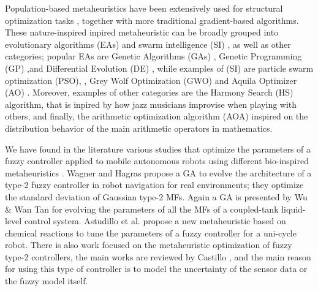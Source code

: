 \documentclass[symmetry,article,submit,moreauthors,pdftex]{Definitions/mdpi}
\begin{document}
Population-based metaheuristics have been extensively used for structural
optimization tasks \cite{perez2007particle,durgun2012structural,yildiz2012new,geem2005harmony}, 
together with more traditional gradient-based algorithms. These nature-inspired inpired 
metaheuristic can be broadly grouped into evolutionary
algorithms (EAs) \cite{back1996evolutionary} and swarm intelligence (SI)
\cite{kennedy2006swarm}, as well as other categories; popular EAs are Genetic
Algorithms (GAs) \cite{holland1992adaptation,eiben2003genetic}, Genetic
Programming (GP) \cite{back1996evolutionary},and Differential Evolution (DE)
\cite{karabouga2004simple}, while examples of (SI) \cite{kennedy2006swarm} are
particle swarm optimization (PSO), \cite{clerc2010particle}, Grey Wolf
Optimization (GWO) \cite{mirjalili2014grey} and Aquila Optimizer (AO)
\cite{abualigah2021aquila}. Moreover, examples of other categories are the
Harmony Search (HS) \cite{geem2001new} algorithm, that is inpired by how jazz
musicians improvise when playing with others, and finally, the arithmetic
optimization algorithm (AOA) \cite{abualigah2021arithmetic} inspired on the
distribution behavior of the main arithmetic operators in mathematics.


We have found in the literature various studies that optimize the parameters of
a fuzzy controller applied to mobile autonomous robots using different
bio-inspired metaheuristics
\cite{hernandez_optimization_2019,lagunes_methodology_2017}.  Wagner and Hagras
\cite{wagner2007genetic} propose a GA to evolve the architecture of a type-2
fuzzy controller in robot navigation for real environments; they optimize the
standard deviation of Gaussian type-2 MFs.  Again a GA is presented by Wu \&
Wan Tan \cite{wu2006genetic} for evolving the parameters of all the MFs of a
coupled-tank liquid-level control system.  Astudillo et al.
\cite{astudillo2013optimization} propose a new metaheuristic based on chemical
reactions to tune the parameters of a fuzzy controller for a uni-cycle robot.
There is also work focused on the metaheuristic optimization of fuzzy type-2
controllers, the main works are reviewed by Castillo
\cite{castillo_review_2012}, and the main reason for using this type of
controller is to model the uncertainty of the sensor data or the fuzzy model
itself.
\end{document}
